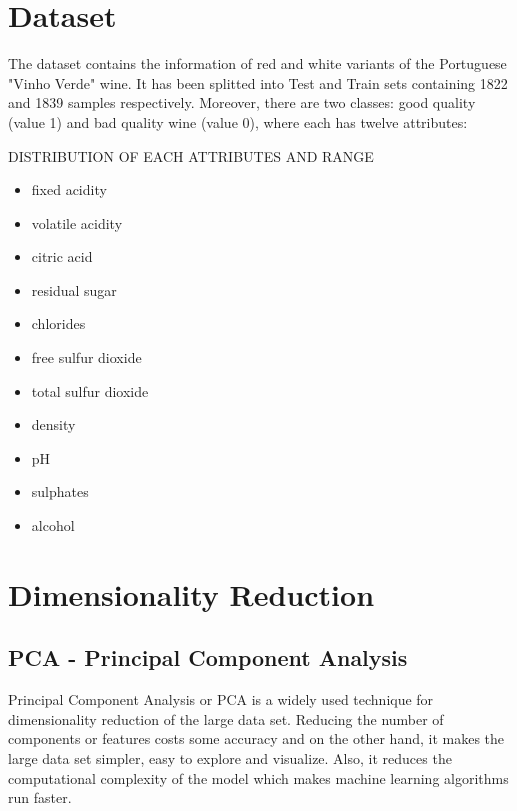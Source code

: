 \documentclass[twoside,a4paper,12pt]{report}
\begin{document}
\tableofcontents

\newpage


\setcounter{chapter}{1}


\section{Dataset}

The dataset contains the information of red and white variants of the Portuguese "Vinho Verde" wine. It has been splitted into Test and Train sets containing 1822 and 1839 samples respectively. Moreover, there are two classes: good quality (value 1) and bad quality wine (value 0), where each has twelve attributes: 

DISTRIBUTION OF EACH ATTRIBUTES AND RANGE

\begin{itemize}
    \item fixed acidity
    \item volatile acidity
    \item citric acid
    \item residual sugar
    \item chlorides
    \item free sulfur dioxide
    \item total sulfur dioxide
    \item density
    \item pH
    \item sulphates
    \item alcohol
\end{itemize}

\section{Dimensionality Reduction}

\subsection{PCA - Principal Component Analysis}

Principal Component Analysis or PCA is a widely used technique for dimensionality reduction of the large data set. Reducing the number of components or features costs some accuracy and on the other hand, it makes the large data set simpler, easy to explore and visualize. Also, it reduces the computational complexity of the model which makes machine learning algorithms run faster.
\end{document}
